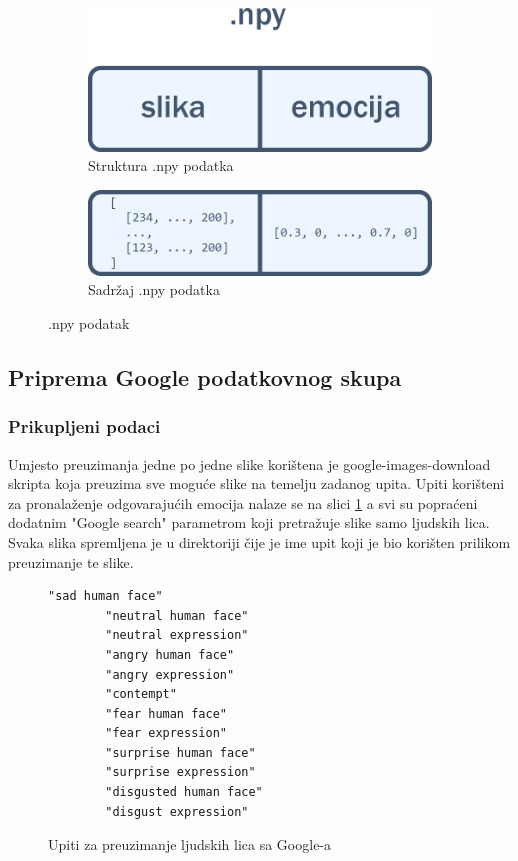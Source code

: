 \documentclass[times, utf8, zavrsni,numeric]{fer}
\begin{document}
\begin{figure}[H]\label{fig:npy_array}
	\begin{subfigure}[b]{0.5\linewidth}
	  	\centering
		\includegraphics[width=\linewidth]{numpy_slika_emocija.png}
		\caption{Struktura .npy podatka}		
	\end{subfigure}
	\begin{subfigure}[b]{0.5\linewidth}
	  	\centering
		\includegraphics[width=\linewidth]{numpy_imgdata_emo.png}
		\caption{Sadržaj .npy podatka}
	\end{subfigure}	
	\caption{.npy podatak}	
\end{figure}


\subsection{Priprema Google podatkovnog skupa}
\subsubsection{Prikupljeni podaci}
Umjesto preuzimanja jedne po jedne slike korištena je google-images-download skripta \cite{google-images-download} koja preuzima sve moguće slike na temelju zadanog upita. Upiti korišteni za pronalaženje odgovarajućih emocija nalaze se na slici \ref{cb:google_queries} a svi su popraćeni dodatnim "Google search" parametrom koji pretražuje slike samo ljudskih lica. Svaka slika spremljena je u direktoriji čije je ime upit koji je bio korišten prilikom preuzimanje te slike. 

\begin{figure}[H]
	\centering
		\begin{Verbatim}[fontsize=\small]
		"sad human face"
		"neutral human face"
		"neutral expression"
		"angry human face"
		"angry expression"
		"contempt"
		"fear human face"
		"fear expression"
		"surprise human face"
		"surprise expression"
		"disgusted human face"
		"disgust expression"
		\end{Verbatim}
	\caption{Upiti za preuzimanje ljudskih lica sa Google-a}
	\label{cb:google_queries}
\end{figure}
\end{document}
